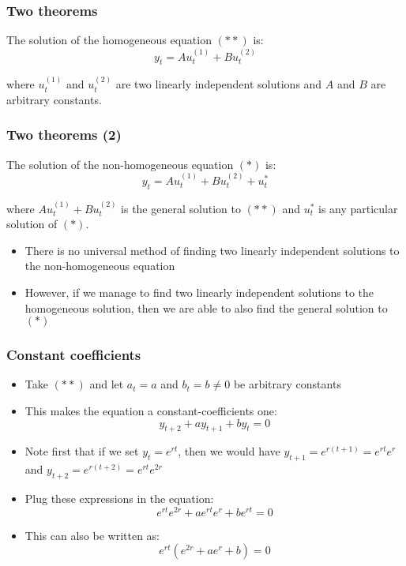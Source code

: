 \documentclass[10pt,usenames,dvipsnames]{beamer}
\theoremstyle{definition}
\begin{document}
\begin{frame}[fragile]
\frametitle{Two theorems}
\begin{theorem}
	The solution of the homogeneous equation $(**)$ is:
	\[
		y_{t} = Au_{t}^{(1)} + Bu_{t}^{(2)}
	\]
	
	where $u_{t}^{(1)}$ and $u_{t}^{(2)}$ are two linearly independent solutions and $A$ and $B$ are arbitrary constants.
\end{theorem}
\end{frame}

\begin{frame}[fragile]
\frametitle{Two theorems (2)}
\begin{theorem}
	The solution of the non-homogeneous equation $(*)$ is:
	\[
		y_{t} = Au_{t}^{(1)} + Bu_{t}^{(2)} + u_{t}^{*}
	\]
	
	where $Au_{t}^{(1)} + Bu_{t}^{(2)}$ is the general solution to $(**)$ and $u_{t}^{*}$ is any particular solution of $(*)$.
\end{theorem}

\begin{itemize}
	\item There is no universal method of finding two linearly independent solutions to the non-homogeneous equation
	\item However, if we manage to find two linearly independent solutions to the homogeneous solution, then we are able to also find the general solution to $(*)$
\end{itemize}
\end{frame}

\begin{frame}[fragile]
\frametitle{Constant coefficients}
\begin{itemize}
	\item Take $(**)$ and let $a_{t} = a$ and $b_{t} = b \neq 0$ be arbitrary constants
	\item This makes the equation a constant-coefficients one:
	\[
		y_{t+2} + ay_{t+1} + by_{t} = 0
	\]
	\item Note first that if we set $y_{t} = e^{rt}$, then we would have $y_{t+1} = e^{r(t+1)} = e^{rt}e^{r}$ and $y_{t+2} = e^{r(t+2)} = e^{rt}e^{2r}$
	\item Plug these expressions in the equation:
	\[
		e^{rt}e^{2r} + ae^{rt}e^{r} + be^{rt} = 0
	\]
	\item This can also be written as:
	\[
		e^{rt}(e^{2r} + ae^{r} + b) = 0
	\] 
\end{itemize}
\end{frame}
\end{document}
